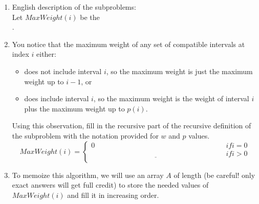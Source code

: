 \documentclass[11pt]{article}
\begin{document}
\begin{enumerate}
\begin{center}
\end{center}


In order to give a dynamic programming solution to this problem, we follow the
four steps:

\item English description of the subproblems:
\\
Let $MaxWeight(i)$ be the \underline{\hspace{3.9in}}\\
\underline{\hspace{5.6in}}.

\item

You notice that the maximum weight of any set of compatible intervals 
at index $i$ either:
\begin{itemize}
    \item does not include interval $i$, so the maximum weight is just the maximum weight
    up to $i-1$, or
    \item does include interval $i$, so the maximum weight is the weight of interval $i$
    plus the maximum weight up to $p(i)$.
\end{itemize}

Using this observation, fill in the recursive part of the recursive definition
of the subproblem with the notation provided for $w$ and $p$ values.
    \begin{equation*}
        MaxWeight(i) =
        \begin{cases}
        0 & if i = 0 \\
        \underline{\hspace{3in}} & if i > 0 \\
        \end{cases}
    \end{equation*}

\item To memoize this algorithm, we will use an array $A$ of length
\underline{\hspace{1in}} (be careful! only exact answers will get full credit)
to store the needed values of $MaxWeight(i)$ and fill it in increasing order.


\end{enumerate}
\end{document}
